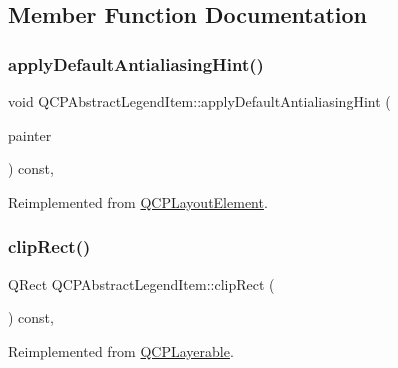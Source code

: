 \subsection{Member Function Documentation}
\mbox{\label{class_q_c_p_abstract_legend_item_a6bfbcb9ace779f4f6fe22241c32a67c9}} 
\subsubsection{\texorpdfstring{apply\+Default\+Antialiasing\+Hint()}{applyDefaultAntialiasingHint()}}
{\footnotesize\ttfamily void Q\+C\+P\+Abstract\+Legend\+Item\+::apply\+Default\+Antialiasing\+Hint (\begin{DoxyParamCaption}\item[{\hyperlink{class_q_c_p_painter}{Q\+C\+P\+Painter} $\ast$}]{painter }\end{DoxyParamCaption}) const\hspace{0.3cm}{\ttfamily [protected]}, {\ttfamily [virtual]}}



Reimplemented from \hyperlink{class_q_c_p_layout_element_a0a8f18141bcf46cf40ad4c13324ff346}{Q\+C\+P\+Layout\+Element}.

\mbox{\label{class_q_c_p_abstract_legend_item_a806fa4d0104bdfc141aa8a36fcc9d51c}} 
\subsubsection{\texorpdfstring{clip\+Rect()}{clipRect()}}
{\footnotesize\ttfamily Q\+Rect Q\+C\+P\+Abstract\+Legend\+Item\+::clip\+Rect (\begin{DoxyParamCaption}{ }\end{DoxyParamCaption}) const\hspace{0.3cm}{\ttfamily [protected]}, {\ttfamily [virtual]}}



Reimplemented from \hyperlink{class_q_c_p_layerable_acbcfc9ecc75433747b1978a77b1864b3}{Q\+C\+P\+Layerable}.

